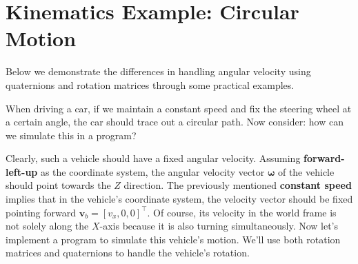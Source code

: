 \section{Kinematics Example: Circular Motion}
\label{sec:motion-example}

Below we demonstrate the differences in handling angular velocity using quaternions and rotation matrices through some practical examples.

When driving a car, if we maintain a constant speed and fix the steering wheel at a certain angle, the car should trace out a circular path. Now consider: how can we simulate this in a program?

Clearly, such a vehicle should have a fixed angular velocity. Assuming \textbf{forward-left-up} as the coordinate system, the angular velocity vector $\boldsymbol{\omega}$ of the vehicle should point towards the $Z$ direction. The previously mentioned \textbf{constant speed} implies that in the vehicle's coordinate system, the velocity vector should be fixed pointing forward $\mathbf{v}_b=[v_x, 0, 0]^\top$. Of course, its velocity in the world frame is not solely along the $X$-axis because it is also turning simultaneously. Now let's implement a program to simulate this vehicle's motion. We'll use both rotation matrices and quaternions to handle the vehicle's rotation.
	
